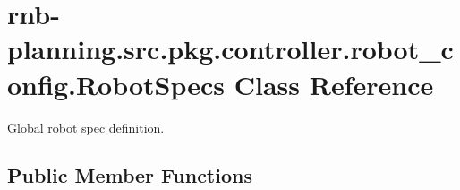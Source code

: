 \hypertarget{classrnb-planning_1_1src_1_1pkg_1_1controller_1_1robot__config_1_1_robot_specs}{}\section{rnb-\/planning.src.\+pkg.\+controller.\+robot\+\_\+config.\+Robot\+Specs Class Reference}
\label{classrnb-planning_1_1src_1_1pkg_1_1controller_1_1robot__config_1_1_robot_specs}


Global robot spec definition.  


\subsection*{Public Member Functions}
